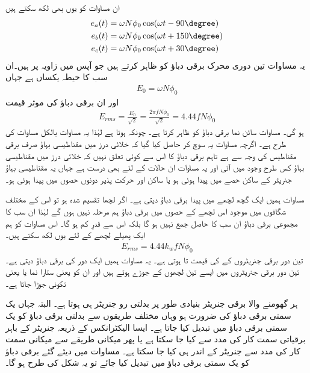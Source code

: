 ان مساوات کو یوں بھی لکھ سکتے ہیں
\begin{gather}
\begin{aligned}
e_a(t)&=\omega N \phi_0 \cos (\omega t -90\degree)\\
e_b(t)&=\omega N \phi_0 \cos (\omega t+150\degree)\\
e_c(t)&=\omega N \phi_0 \cos (\omega t+30\degree)
\end{aligned}
\end{gather}
یہ مساوات تین دوری محرک برقی دباؤ  کو ظاہر کرتے ہیں جو آپس میں  زاویہ پر ہیں۔ان سب کا حیطہ  یکساں ہے جہاں
\begin{align}
E_0=\omega N \phi_0
\end{align}
اور ان برقی دباؤ کی موثر قیمت
\begin{align}
E_{rms}=\frac{E_0}{\sqrt{2}}=\frac{2\pi f N \phi_0}{\sqrt{2}}=4.44 f N \phi_0
\end{align}
ہو گی۔ مساوات  سائن نما برقی دباؤ کو ظاہر کرتا ہے۔ چونکہ ہوتا ہے  لہٰذا یہ مساوات بالکل مساوات  کی طرح ہے۔ اگرچہ مساوات  یہ سوچ کر حاصل کیا گیا کہ خلائی درز میں مقناطیسی بہاؤ صرف برقی مقناطیس کی وجہ سے ہے تاہم برقی دباؤ کا اس سے کوئی تعلق نہیں کہ خلائی درز میں مقناطیسی بہاؤ کس طرح وجود میں آئی اور یہ مساوات ان حالات کے لئے بھی درست ہے جہاں یہ مقناطیسی بہاؤ جنریٹر کے ساکن حصے میں پیدا ہوئی ہو یا ساکن اور حرکت پذیر دونوں حصوں میں پیدا ہوئی ہو۔

مساوات  ہمیں ایک گچھ لچھے میں پیدا برقی دباؤ دیتی ہے۔ اگر لچھا تقسیم شدہ ہو تو اس کے مختلف شگافوں میں موجود اس لچھے کے حصوں میں برقی دباؤ ہم مرحلہ نہیں ہوں گے لہٰذا ان سب کا مجموعی برقی دباؤ ان سب کا حاصل جمع نہیں ہو گا بلکہ اس سے قدرِ کم ہو گا۔ اس مساوات کو ہم ایک پھیلے لچھے کے لئے یوں لکھ سکتے ہیں۔
\begin{align}
E_{rms}=4.44 k_w f N \phi_0
\end{align}
تین دور برقی جنریٹروں کے  کی قیمت  تا  ہوتی ہے۔ یہ مساوات ہمیں ایک دور کی برقی دباؤ دیتی ہے۔ تین دور برقی جنریٹروں میں ایسے تین لچھوں کے جوڑے ہوتے ہیں اور ان کو  یعنی ستارا نما یا  یعنی تکونی جوڑا جاتا ہے۔

ہر گھومنے والا برقی جنریٹر بنیادی طور پر بدلتی رو جنریٹر ہی ہوتا ہے۔ البتہ جہاں یک سمتی برقی دباؤ  کی ضرورت ہو وہاں مختلف طریقوں سے بدلتی برقی دباؤ  کو یک سمتی برقی دباؤ میں تبدیل کیا جاتا ہے۔ ایسا الیکٹرانکس کے ذریعہ جنریٹر کے باہر برقیاتی سمت کار کی مدد سے  کیا جا سکتا ہے یا پھر میکانی طریقے سے میکانی سمت کار  کی مدد سے جنریٹر کے اندر ہی کیا جا سکتا ہے۔ مساوات  میں دیئے گئے برقی دباؤ کو یک سمتی برقی دباؤ میں تبدیل کیا جائے تو یہ شکل  کی طرح ہو گا۔

